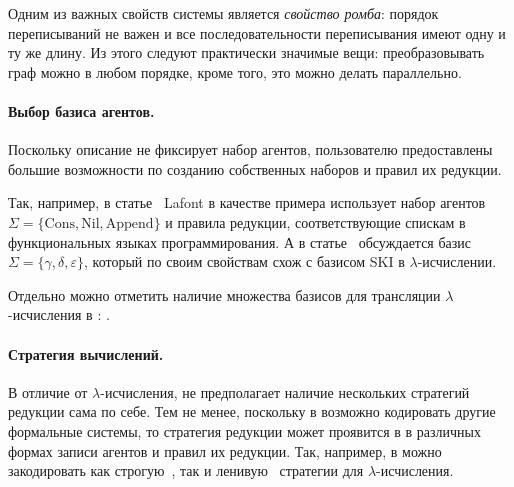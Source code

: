 Одним из важных свойств системы является \textit{свойство ромба}: порядок переписываний не важен и все последовательности переписывания имеют одну и ту же длину.
Из этого следуют практически значимые вещи: преобразовывать граф можно в любом порядке, кроме того, это можно делать параллельно.

\paragraph{Выбор базиса агентов.}

Поскольку описание \INs{} не фиксирует набор агентов, пользователю предоставлены большие возможности по созданию собственных наборов и правил их редукции.

Так, например, в статье~\cite{lafontInteractionNets1989} Lafont в качестве примера использует набор агентов $\Sigma = \{\text{Cons}, \text{Nil}, \text{Append}\}$ и правила редукции, соответствующие спискам в функциональных языках программирования.
А в статье~\cite{lafontInteractionCombinators1997a} обсуждается базис $\Sigma = \{\gamma, \delta, \varepsilon\}$, который по своим свойствам схож с базисом SKI в $\lambda$-исчислении.

Отдельно можно отметить наличие множества базисов для трансляции $\lambda$-исчисления в \INs{}: \cite{lampingAlgorithmOptimalLambda1990,aspertiBolognaOptimalHigherorder1996,gonthierGeometryOptimalLambda1992,mackieInteractionNetImplementation2011,vincentvanoostromLambdascopeAnotherOptimal2004,sinotCallbyNameCallbyValueTokenPassing2005}.

\paragraph{Стратегия вычислений.}

В отличие от $\lambda$-исчисления, \INs{} не предполагает наличие нескольких стратегий редукции сама по себе.
Тем не менее, поскольку в \INs{} возможно кодировать другие формальные системы, то стратегия редукции может проявится в \INs{} в различных формах записи агентов и правил их редукции.
Так, например, в \INs{} можно закодировать как строгую~\cite{sinotCallbyNameCallbyValueTokenPassing2005}, так и ленивую~\cite{sinotTokenPassingNetsCallbyNeed2006} стратегии для $\lambda$-исчисления.
